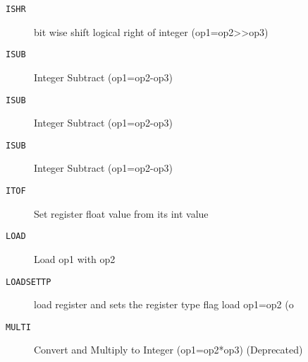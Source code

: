 \begin{description}
\item[\texttt{ISHR       }]  bit wise shift logical right of integer (op1=op2>>op3)\\
\end{description}

\begin{description}
\item[\texttt{ISUB       }]  Integer Subtract (op1=op2-op3)\\
\end{description}

\begin{description}
\item[\texttt{ISUB       }]  Integer Subtract (op1=op2-op3)\\
\end{description}

\begin{description}
\item[\texttt{ISUB       }]  Integer Subtract (op1=op2-op3)\\
\end{description}

\begin{description}
\item[\texttt{ITOF       }]  Set register float value from its int value\\
\end{description}

\begin{description}
\item[\texttt{LOAD       }]  Load op1 with op2\\
\end{description}

\begin{description}
\item[\texttt{LOADSETTP  }]  load register and sets the register type flag load op1=op2 (o\\
\end{description}

\begin{description}
\item[\texttt{MULTI      }]  Convert and Multiply to Integer (op1=op2*op3) (Deprecated)\\
\end{description}

